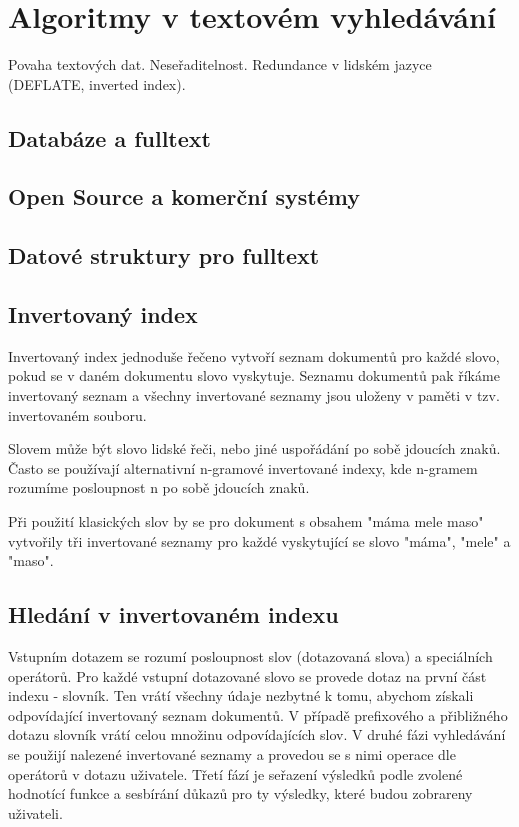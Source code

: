 \documentclass[11pt]{article}
\begin{document}
\section{Algoritmy v textovém vyhledávání}
Povaha textových dat. Neseřaditelnost. Redundance v lidském jazyce (DEFLATE, inverted index).

\subsection{Databáze a fulltext}
\subsection{Open Source a komerční systémy}

\subsection{Datové struktury pro fulltext}

\subsection{Invertovaný index}
Invertovaný index jednoduše řečeno vytvoří seznam dokumentů pro každé slovo,
pokud se v daném dokumentu slovo vyskytuje. Seznamu dokumentů pak říkáme
invertovaný seznam a všechny invertované seznamy jsou uloženy v paměti v tzv.
invertovaném souboru.

Slovem může být slovo lidské řeči, nebo jiné uspořádání po sobě jdoucích znaků.
Často se používají alternativní n-gramové invertované indexy, kde n-gramem
rozumíme posloupnost n po sobě jdoucích znaků.

Při použití klasických slov by se pro dokument s obsahem "máma mele maso"
vytvořily tři invertované seznamy pro každé vyskytující se slovo "máma", "mele"
a "maso".

\subsection{Hledání v invertovaném indexu}
Vstupním dotazem se rozumí posloupnost slov (dotazovaná slova) a speciálních
operátorů. Pro každé vstupní dotazované slovo se provede dotaz na první část
indexu - slovník. Ten vrátí všechny údaje nezbytné k tomu, abychom získali
odpovídající invertovaný seznam dokumentů. V případě prefixového a přibližného
dotazu slovník vrátí celou množinu odpovídajících slov.  V druhé fázi
vyhledávání se použijí nalezené invertované seznamy a provedou se s nimi
operace dle operátorů v dotazu uživatele. Třetí fází je seřazení výsledků podle
zvolené hodnotící funkce a sesbírání důkazů pro ty výsledky, které budou
zobrareny uživateli.
\end{document}
